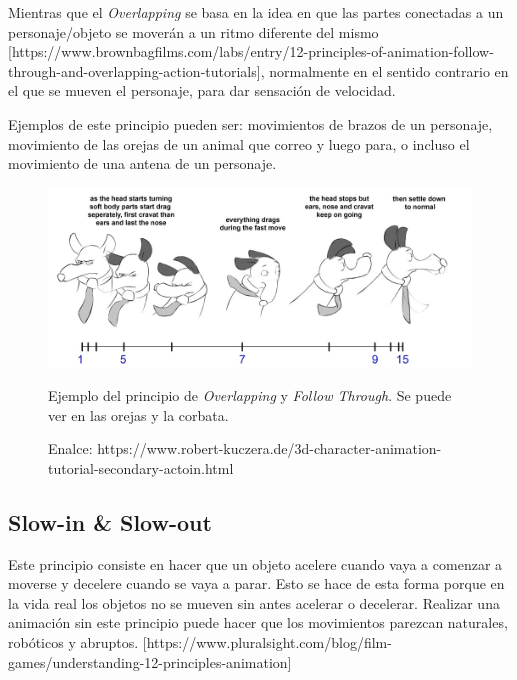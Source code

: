 \documentclass{article}
\begin{document}
\bigskip

Mientras que el \textit{Overlapping} se basa en la idea en que las partes conectadas a un personaje/objeto se moverán a un ritmo diferente del mismo [https://www.brownbagfilms.com/labs/entry/12-principles-of-animation-follow-through-and-overlapping-action-tutorials], normalmente en el sentido contrario en el que se mueven el personaje, para dar sensación de velocidad.

\bigskip

Ejemplos de este principio pueden ser: movimientos de brazos de un personaje, movimiento de las orejas de un animal que correo y luego para, o incluso el movimiento de una antena de un personaje.

\begin{figure}[H]
    \centering
    \includegraphics[width=\textwidth]{imagenes/overlap-08.jpg}
    \caption{Ejemplo del principio de \textit{Overlapping} y \textit{Follow Through}. Se puede ver en las orejas y la corbata.}
    \caption{Enalce: https://www.robert-kuczera.de/3d-character-animation-tutorial-secondary-actoin.html}
\end{figure}

\subsection{Slow-in \& Slow-out}


Este principio consiste en hacer que un objeto acelere cuando vaya a comenzar a moverse y decelere cuando se vaya a parar. Esto se hace de esta forma porque en la vida real los objetos no se mueven sin antes acelerar o decelerar. Realizar una animación sin este principio puede hacer que los movimientos parezcan naturales, robóticos y abruptos. [https://www.pluralsight.com/blog/film-games/understanding-12-principles-animation]
\end{document}
